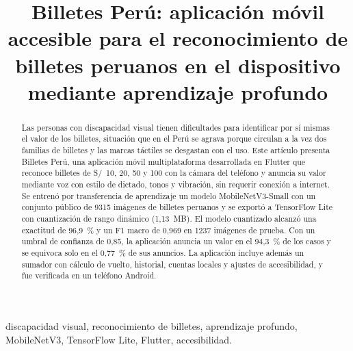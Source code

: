 \documentclass[conference,a4paper]{IEEEtran}
\begin{document}
\title{Billetes Perú: aplicación móvil accesible para el reconocimiento de billetes peruanos en el dispositivo mediante aprendizaje profundo}

\author{
\and
{}
}

\maketitle

\begin{abstract}
Las personas con discapacidad visual tienen dificultades para identificar por sí mismas el valor de los billetes, situación que en el Perú se agrava porque circulan a la vez dos familias de billetes y las marcas táctiles se desgastan con el uso. Este artículo presenta Billetes Perú, una aplicación móvil multiplataforma desarrollada en Flutter que reconoce billetes de S/~10, 20, 50 y 100 con la cámara del teléfono y anuncia su valor mediante voz con estilo de dictado, tonos y vibración, sin requerir conexión a internet. Se entrenó por transferencia de aprendizaje un modelo MobileNetV3-Small con un conjunto público de 9315 imágenes de billetes peruanos y se exportó a TensorFlow Lite con cuantización de rango dinámico (1,13~MB). El modelo cuantizado alcanzó una exactitud de 96,9~\% y un F1 macro de 0,969 en 1237 imágenes de prueba. Con un umbral de confianza de 0,85, la aplicación anuncia un valor en el 94,3~\% de los casos y se equivoca solo en el 0,77~\% de sus anuncios. La aplicación incluye además un sumador con cálculo de vuelto, historial, cuentas locales y ajustes de accesibilidad, y fue verificada en un teléfono Android.
\end{abstract}

\begin{IEEEkeywords}
discapacidad visual, reconocimiento de billetes, aprendizaje profundo, MobileNetV3, TensorFlow Lite, Flutter, accesibilidad.
\end{IEEEkeywords}
\end{document}
